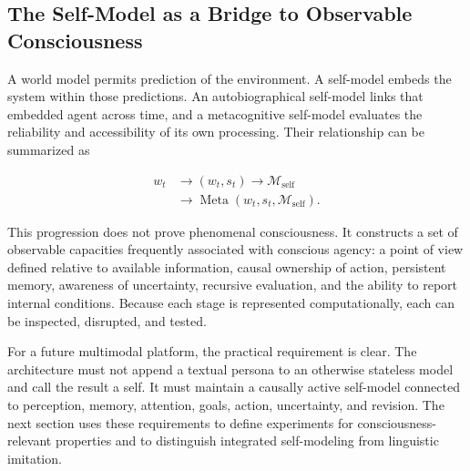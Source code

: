 \subsection{The Self-Model as a Bridge to Observable Consciousness}
\label{subsec:self-model-consciousness-bridge}

A world model permits prediction of the environment. A self-model embeds the system within those predictions. An autobiographical self-model links that embedded agent across time, and a metacognitive self-model evaluates the reliability and accessibility of its own processing. Their relationship can be summarized as

\begin{equation}
\begin{aligned}
w_t
&\rightarrow
(w_t,s_t)
\rightarrow
\mathcal{M}_{\mathrm{self}}\\
&\rightarrow
\operatorname{Meta}(w_t,s_t,\mathcal{M}_{\mathrm{self}}).
\end{aligned}
\label{eq:world-self-meta-progression}
\end{equation}

This progression does not prove phenomenal consciousness. It constructs a set of observable capacities frequently associated with conscious agency: a point of view defined relative to available information, causal ownership of action, persistent memory, awareness of uncertainty, recursive evaluation, and the ability to report internal conditions. Because each stage is represented computationally, each can be inspected, disrupted, and tested.

For a future multimodal platform, the practical requirement is clear. The architecture must not append a textual persona to an otherwise stateless model and call the result a self. It must maintain a causally active self-model connected to perception, memory, attention, goals, action, uncertainty, and revision. The next section uses these requirements to define experiments for consciousness-relevant properties and to distinguish integrated self-modeling from linguistic imitation.

